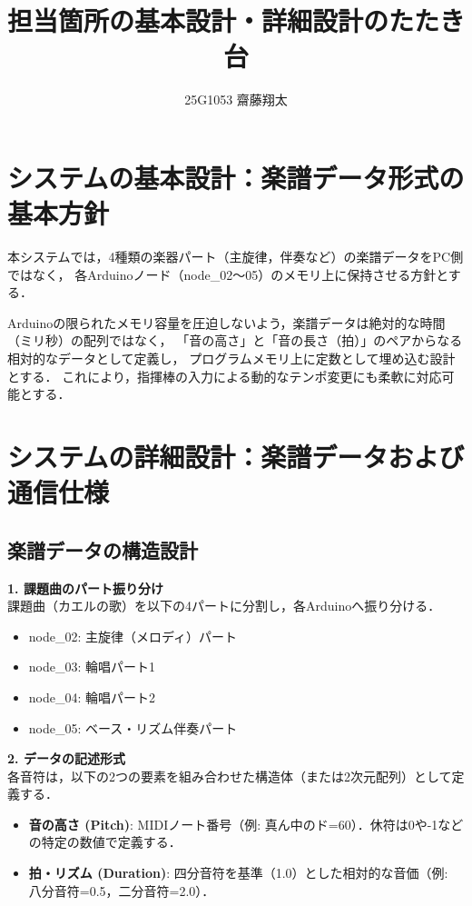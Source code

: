 \documentclass[uplatex,dvipdfmx]{jlreq}
\begin{document}
\title{担当箇所の基本設計・詳細設計のたたき台}
\author{25G1053 齋藤翔太}
\maketitle

\section{システムの基本設計：楽譜データ形式の基本方針}

本システムでは，4種類の楽器パート（主旋律，伴奏など）の楽譜データをPC側ではなく，
各Arduinoノード（node\_02〜05）のメモリ上に保持させる方針とする．

Arduinoの限られたメモリ容量を圧迫しないよう，楽譜データは絶対的な時間（ミリ秒）の配列ではなく，
「音の高さ」と「音の長さ（拍）」のペアからなる相対的なデータとして定義し，
プログラムメモリ上に定数として埋め込む設計とする．
これにより，指揮棒の入力による動的なテンポ変更にも柔軟に対応可能とする．

\section{システムの詳細設計：楽譜データおよび通信仕様}

\subsection{楽譜データの構造設計}

\textbf{1. 課題曲のパート振り分け} \\
課題曲（カエルの歌）を以下の4パートに分割し，各Arduinoへ振り分ける．
\begin{itemize}
    \item node\_02: 主旋律（メロディ）パート
    \item node\_03: 輪唱パート1
    \item node\_04: 輪唱パート2
    \item node\_05: ベース・リズム伴奏パート
\end{itemize}

\textbf{2. データの記述形式} \\
各音符は，以下の2つの要素を組み合わせた構造体（または2次元配列）として定義する．
\begin{itemize}
    \item \textbf{音の高さ (Pitch)}: MIDIノート番号（例: 真ん中のド=60）．休符は0や-1などの特定の数値で定義する．
    \item \textbf{拍・リズム (Duration)}: 四分音符を基準（1.0）とした相対的な音価（例: 八分音符=0.5，二分音符=2.0）．
\end{itemize}
\end{document}
